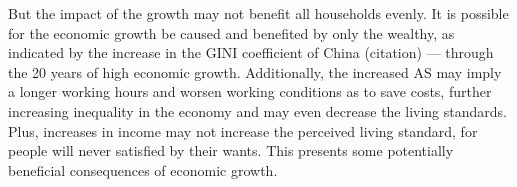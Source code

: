\documentclass[a4paper,12pt]{article}
\begin{document}
But the impact of the growth may not benefit all households evenly. It is possible for the economic growth be caused and benefited by only the wealthy, as indicated by the increase in the GINI coefficient of China (citation) --- through the 20 years of high economic growth. Additionally, the increased AS may imply a longer working hours and worsen working conditions as to save costs, further increasing inequality in the economy and may even decrease the living standards. Plus, increases in income may not increase the perceived living standard, for people will never satisfied by their wants. This presents some potentially beneficial consequences of economic growth.
\end{document}
